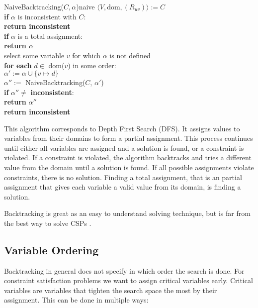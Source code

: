 \begin{function}{NaiveBacktracking($C, \alpha$)}{naive}
	$\langle V, \text{dom}, (R_{uv})\rangle := C$ \\
	\textbf{if} $\alpha$ is inconsistent with $C$: \\
	\null \qquad \textbf{return inconsistent} \\

	\textbf{if} $\alpha$ is a total assignment: \\
	\null \qquad \textbf{return $\alpha$} \\

	select some variable $v$ for which $\alpha$ is not defined \\
	\textbf{for each} $d \in$ dom($v$) in some order: \\
	\null \qquad  $\alpha' := \alpha \cup \{v \mapsto d\}$ \\
	\null \qquad  $\alpha'' := $ NaiveBacktracking($C$, $\alpha'$) \\
	\null \qquad  \textbf{if} $\alpha'' \neq$ \textbf{inconsistent}: \\
	\null \qquad \qquad  \textbf{return} $\alpha''$ \\

	\textbf{return inconsistent}
\end{function}

This algorithm corresponds to Depth First Search (DFS). It assigns values to variables from their domains to form a partial assignment. This process continues until either all variables are assigned and a solution is found, or a constraint is violated. If a constraint is violated, the algorithm backtracks and tries a different value from the domain until a solution is found. If all possible assignments violate constraints, there is no solution. Finding a total assignment, that is an partial assignment that gives each variable a valid value from its domain, is finding a solution.

Backtracking is great as an easy to understand solving technique, but is far from the best way to solve CSPs \cite{forward_checking:1995}.

\subsection{Variable Ordering}

Backtracking in general does not specify in which order the search is done. For constraint satisfaction problems we want to assign critical variables early. Critical variables are variables that tighten the search space the most by their assignment. This can be done in multiple ways:

